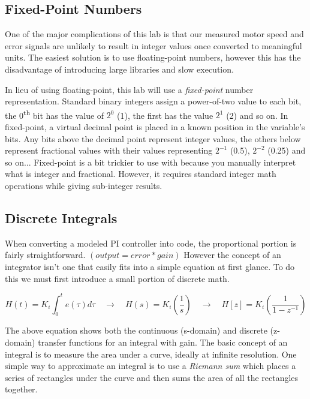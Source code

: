\documentclass[openany,11pt,fleqn]{book} %
\begin{document}
\subsection{\color{orange}Fixed-Point Numbers}
One of the major complications of this lab is that our measured motor speed and error signals are unlikely to result in integer values once converted to meaningful units. The easiest solution is to use floating-point numbers, however this has the disadvantage of introducing large libraries and slow execution. 

In lieu of using floating-point, this lab will use a \textit{fixed-point} number representation. Standard binary integers assign a power-of-two value to each bit, the 0\textsuperscript{th} bit has the value of $2^{0}$ (1), the first has the value $2^{1}$ (2) and so on. In fixed-point, a virtual decimal point is placed in a known position in the variable's bits. Any bits above the decimal point represent integer values, the others below represent fractional values with their values representing $2^{-1}$ (0.5), $2^{-2}$ (0.25) and so on...
Fixed-point is a bit trickier to use with because you manually interpret what is integer and fractional. However, it requires standard integer math operations while giving sub-integer results. 


\subsection{\color{orange}Discrete Integrals}

When converting a modeled PI controller into code, the proportional portion is fairly straightforward. $(output = error * gain)$ However the concept of an integrator isn't one that easily fits into a simple equation at first glance. To do this we must first introduce a small portion of discrete math.

\begin{equation*}
H(t) = K_{i}\int_{0}^{t}e(\tau)d\tau \quad \rightarrow \quad H(s) = K_{i}\left(\frac{1}{s}\right) \quad \rightarrow \quad H[z] = K_{i}\left(\frac{1}{1-z^{-1}}\right)
\end{equation*} 


\noindent The above equation shows both the continuous (s-domain) and discrete (z-domain) transfer functions for an integral with gain. The basic concept of an integral is to measure the area under a curve, ideally at infinite resolution. One simple way to approximate an integral is to use a \textit{Riemann sum} which places a series of rectangles under the curve and then sums the area of all the rectangles together. 
\end{document}
